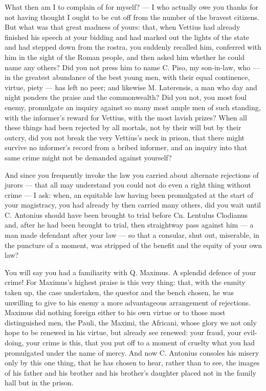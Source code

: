  What then am I to complain of for myself? --- I who actually owe you thanks for not having thought I ought to be cut off from the number of the bravest citizens. But what was that great madness of yours: that, when Vettius had already finished his speech at your bidding and had marked out the lights of the state and had stepped down from the rostra, you suddenly recalled him, conferred with him in the sight of the Roman people, and then asked him whether he could name any others? Did you not press him to name C. Piso, my son-in-law, who --- in the greatest abundance of the best young men, with their equal continence, virtue, piety --- has left no peer; and likewise M. Laterensis, a man who day and night ponders the praise and the commonwealth? Did you not, you most foul enemy, promulgate an inquiry against so many most ample men of such standing, with the informer's reward for Vettius, with the most lavish prizes? When all these things had been rejected by all mortals, not by their will but by their outcry, did you not break the very Vettius's neck in prison, that there might survive no informer's record from a bribed informer, and an inquiry into that same crime might not be demanded against yourself?

 And since you frequently invoke the law you carried about alternate rejections of jurors --- that all may understand you could not do even a right thing without crime --- I ask: when, an equitable law having been promulgated at the start of your magistracy, you had already by then carried many others, did you wait until C. Antonius should have been brought to trial before Cn. Lentulus Clodianus and, after he had been brought to trial, then straightway pass against him --- a man made defendant after your law --- so that a consular, shut out, miserable, in the puncture of a moment, was stripped of the benefit and the equity of your own law?

 You will say you had a familiarity with Q. Maximus. A splendid defence of your crime! For Maximus's highest praise is this very thing: that, with the enmity taken up, the case undertaken, the questor and the bench chosen, he was unwilling to give to his enemy a more advantageous arrangement of rejections. Maximus did nothing foreign either to his own virtue or to those most distinguished men, the Pauli, the Maximi, the Africani, whose glory we not only hope to be renewed in his virtue, but already see renewed: your fraud, your evil-doing, your crime is this, that you put off to a moment of cruelty what you had promulgated under the name of mercy. And now C. Antonius consoles his misery only by this one thing, that he has chosen to hear, rather than to see, the images of his father and his brother and his brother's daughter placed not in the family hall but in the prison.

